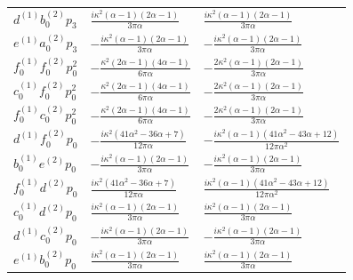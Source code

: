 {\begin{longtable}{lll}
$d^{(1)} b_0^{(2)} p_3$ & $\frac{i \kappa^{2} \left(\alpha - 1\right) \left(2 \alpha - 1\right)}{3 \pi \alpha}$ & $\frac{i \kappa^{2} \left(\alpha - 1\right) \left(2 \alpha - 1\right)}{3 \pi \alpha}$\\
$e^{(1)} a_0^{(2)} p_3$ & $- \frac{i \kappa^{2} \left(\alpha - 1\right) \left(2 \alpha - 1\right)}{3 \pi \alpha}$ & $- \frac{i \kappa^{2} \left(\alpha - 1\right) \left(2 \alpha - 1\right)}{3 \pi \alpha}$\\
$f_0^{(1)} f_0^{(2)} p_0^{2}$ & $- \frac{\kappa^{2} \left(2 \alpha - 1\right) \left(4 \alpha - 1\right)}{6 \pi \alpha}$ & $- \frac{2 \kappa^{2} \left(\alpha - 1\right) \left(2 \alpha - 1\right)}{3 \pi \alpha}$\\
$c_0^{(1)} f_0^{(2)} p_0^{2}$ & $- \frac{\kappa^{2} \left(2 \alpha - 1\right) \left(4 \alpha - 1\right)}{6 \pi \alpha}$ & $- \frac{2 \kappa^{2} \left(\alpha - 1\right) \left(2 \alpha - 1\right)}{3 \pi \alpha}$\\
$f_0^{(1)} c_0^{(2)} p_0^{2}$ & $- \frac{\kappa^{2} \left(2 \alpha - 1\right) \left(4 \alpha - 1\right)}{6 \pi \alpha}$ & $- \frac{2 \kappa^{2} \left(\alpha - 1\right) \left(2 \alpha - 1\right)}{3 \pi \alpha}$\\
$d^{(1)} f_0^{(2)} p_0$ & $- \frac{i \kappa^{2} \left(41 \alpha^{2} - 36 \alpha + 7\right)}{12 \pi \alpha}$ & $- \frac{i \kappa^{2} \left(\alpha - 1\right) \left(41 \alpha^{2} - 43 \alpha + 12\right)}{12 \pi \alpha^{2}}$\\
$b_0^{(1)} e^{(2)} p_0$ & $- \frac{i \kappa^{2} \left(\alpha - 1\right) \left(2 \alpha - 1\right)}{3 \pi \alpha}$ & $- \frac{i \kappa^{2} \left(\alpha - 1\right) \left(2 \alpha - 1\right)}{3 \pi \alpha}$\\
$f_0^{(1)} d^{(2)} p_0$ & $\frac{i \kappa^{2} \left(41 \alpha^{2} - 36 \alpha + 7\right)}{12 \pi \alpha}$ & $\frac{i \kappa^{2} \left(\alpha - 1\right) \left(41 \alpha^{2} - 43 \alpha + 12\right)}{12 \pi \alpha^{2}}$\\
$c_0^{(1)} d^{(2)} p_0$ & $\frac{i \kappa^{2} \left(\alpha - 1\right) \left(2 \alpha - 1\right)}{3 \pi \alpha}$ & $\frac{i \kappa^{2} \left(\alpha - 1\right) \left(2 \alpha - 1\right)}{3 \pi \alpha}$\\
$d^{(1)} c_0^{(2)} p_0$ & $- \frac{i \kappa^{2} \left(\alpha - 1\right) \left(2 \alpha - 1\right)}{3 \pi \alpha}$ & $- \frac{i \kappa^{2} \left(\alpha - 1\right) \left(2 \alpha - 1\right)}{3 \pi \alpha}$\\
$e^{(1)} b_0^{(2)} p_0$ & $\frac{i \kappa^{2} \left(\alpha - 1\right) \left(2 \alpha - 1\right)}{3 \pi \alpha}$ & $\frac{i \kappa^{2} \left(\alpha - 1\right) \left(2 \alpha - 1\right)}{3 \pi \alpha}$\\

\end{longtable}}

